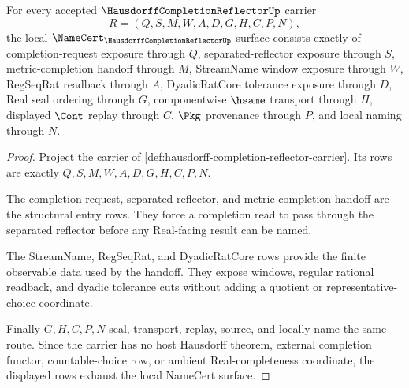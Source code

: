 \begin{theorem}
\label{thm:hausdorff-completion-reflector-namecert-obligations}
For every accepted $\HausdorffCompletionReflectorUp$ carrier
$$
R=(Q,S,M,W,A,D,G,H,C,P,N),
$$
the local $\NameCert_{\HausdorffCompletionReflectorUp}$ surface consists exactly of completion-request exposure through $Q$, separated-reflector exposure through $S$, metric-completion handoff through $M$, StreamName window exposure through $W$, RegSeqRat readback through $A$, DyadicRatCore tolerance exposure through $D$, Real seal ordering through $G$, componentwise $\hsame$ transport through $H$, displayed $\Cont$ replay through $C$, $\Pkg$ provenance through $P$, and local naming through $N$.
\end{theorem}
\begin{proof}
Project the carrier of \autoref{def:hausdorff-completion-reflector-carrier}. Its rows are exactly $Q,S,M,W,A,D,G,H,C,P,N$.

The completion request, separated reflector, and metric-completion handoff are the structural entry rows. They force a completion read to pass through the separated reflector before any Real-facing result can be named.

The StreamName, RegSeqRat, and DyadicRatCore rows provide the finite observable data used by the handoff. They expose windows, regular rational readback, and dyadic tolerance cuts without adding a quotient or representative-choice coordinate.

Finally $G,H,C,P,N$ seal, transport, replay, source, and locally name the same route. Since the carrier has no host Hausdorff theorem, external completion functor, countable-choice row, or ambient Real-completeness coordinate, the displayed rows exhaust the local NameCert surface.
\end{proof}



